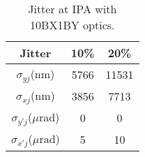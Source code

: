 \begin{table}[t]
\centering
 \begin{tabular}{|c|c|c|}\hline
 Jitter &10\% & 20\%\\\hline
 $\sigma_{yj}$(nm) &5766&11531\\\hline
 $\sigma_{xj}$(nm) &3856&7713\\\hline
 $\sigma_{y'j}$($\mu$rad) &0&0\\\hline
 $\sigma_{x'j}$($\mu$rad) &5&10\\\hline
 \end{tabular}
 \caption{Jitter at IPA with 10BX1BY optics.}\label{t-jitter10BX1BY-IPA}
\end{table}
\par
